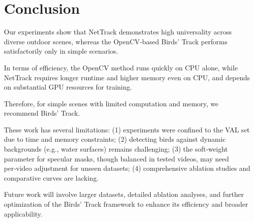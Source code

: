 \section{Conclusion}
Our experiments show that NetTrack demonstrates high universality across diverse outdoor scenes, whereas the OpenCV‑based Birds’ Track performs satisfactorily only in simple scenarios.

In terms of efficiency, the OpenCV method runs quickly on CPU alone, while NetTrack requires longer runtime and higher memory even on CPU, and depends on substantial GPU resources for training.

Therefore, for simple scenes with limited computation and memory, we recommend Birds’ Track.

These work has several limitations: (1) experiments were confined to the VAL set due to time and memory constraints; (2) detecting birds against dynamic backgrounds (e.g., water surfaces) remains challenging; (3) the soft‑weight parameter for specular masks, though balanced in tested videos, may need per‑video adjustment for unseen datasets; (4) comprehensive ablation studies and comparative curves are lacking.

Future work will involve larger datasets, detailed ablation analyses, and further optimization of the Birds’ Track framework to enhance its efficiency and broader applicability.